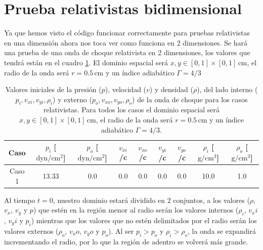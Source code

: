 \documentclass[12pt,a4paper]{book}
\begin{document}


\section{Prueba relativistas bidimensional}
Ya que hemos visto el código funcionar correctamente para pruebas relativistas en una dimensión ahora nos toca ver
como funciona en 2 dimensiones. Se hará una prueba de una onda de choque relativista en 2 dimensiones, los valores
que tendrá están en el cuadro \ref{Cuadro_parametros_choque_2D}. El dominio espacial 
será $x, y \in [0,1]\times[0,1] \, \text{cm}$, el radio de la onda
será $r = 0.5 \, \text{cm}$ y un índice adiabático $\Gamma = 4/3$

\begin{table}[htbp]
  \begin{center}
  \begin{tabular}{|c|c|c|c|c|c|c|c|c|}
  \hline 
  \textbf{Caso} & \textbf{$p_i$} [$\text{dyn}/\text{cm}^2$] & 
  \textbf{$p_o$} [$\text{dyn}/\text{cm}^2$] & 
  \textbf{$v_{xi}$}/c & \textbf{$v_{xo}$}/c  & \textbf{$v_{yi}$}/c & \textbf{$v_{yo}$}/c  & 
  \textbf{$\rho_i$} [$\text{g}/\text{cm}^3$]& 
  \textbf{$\rho_o$} [$\text{g}/\text{cm}^3$]\\ 
  \hline 
  Caso 1 & 13.33  & 0.0  & 0.0 & 0.0 & 0.0 & 0.0 & 10.0  & 1.0 \\ 
  \hline 
  \end{tabular}
  \caption{\label{Cuadro_parametros_choque_2D} Valores iniciales 
  de la presión ($p$), velocidad ($v$)
  y densidad ($\rho$), del lado interno ($p_i, v_{xi}, v_{yi}, \rho_i$) y 
  externo ($p_o, v_{xo}, v_{yo}, \rho_o$) de la onda de choque
  para los casos relativistas. Para todos los
  casos el dominio espacial será $x, y \in [0,1]\times[0,1] \, \text{cm}$, el radio de la onda
  será $r = 0.5 \, \text{cm}$ y un índice adiabático $\Gamma = 4/3$.}
  \end{center}
\end{table}

Al tiempo $t = 0$, nuestro dominio estará dividido en 2 conjuntos, a los valores ($\rho$, $v_x$, $v_y$
y $p$) que estén en la región menor al radio serán los valores internos ($\rho_i$, $v_xi$, $v_yi$ 
y $p_i$) mientras que los valores que no estén delimitados por el radio serán los valores externos
($\rho_o$, $v_xo$, $v_yo$ y $p_o$). Al ser $p_i > p_o$ y $\rho_i > \rho_o$, la onda se 
expandirá incrementando el radio, por lo que la región de adentro se volverá más grande.
\end{document}
